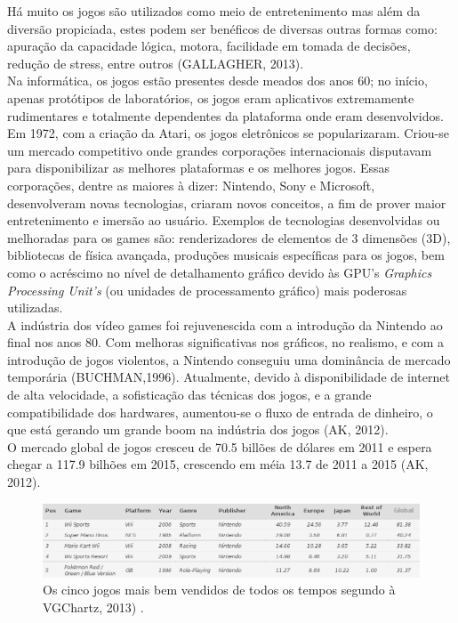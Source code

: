 \documentclass{article}
\begin{document}
Há muito os jogos são utilizados como meio de entretenimento mas além da diversão propiciada, estes podem ser benéficos de diversas outras formas como: apuração da capacidade lógica, motora, facilidade em tomada de decisões, redução de stress, entre outros (GALLAGHER, 2013).
\\
	Na informática, os jogos estão presentes desde meados dos anos 60; no início, apenas protótipos de laboratórios, os jogos eram aplicativos extremamente rudimentares e totalmente dependentes da plataforma onde eram desenvolvidos.
\\
Em 1972, com a criação da Atari, os jogos eletrônicos se popularizaram. Criou-se um mercado competitivo onde grandes corporações internacionais disputavam para disponibilizar as melhores plataformas e os melhores jogos.  Essas corporações, dentre as maiores à dizer: Nintendo, Sony e Microsoft, desenvolveram novas tecnologias, criaram novos conceitos, a fim de prover maior entretenimento e imersão ao usuário. Exemplos de tecnologias desenvolvidas ou melhoradas para os games são: renderizadores de elementos de 3 dimensões (3D), bibliotecas de física avançada, produções musicais específicas para os jogos, bem como o acréscimo no nível de detalhamento gráfico devido às GPU's \textit{Graphics Processing Unit's} (ou unidades de processamento gráfico) mais poderosas utilizadas.
\\
A indústria dos vídeo games foi rejuvenescida com a introdução da Nintendo ao final nos anos 80. Com melhoras significativas  nos gráficos, no realismo, e com a introdução de jogos violentos, a Nintendo conseguiu uma dominância de mercado temporária (BUCHMAN,1996).
	Atualmente, devido à disponibilidade de internet de alta velocidade, a sofisticação das técnicas dos jogos, e a grande compatibilidade dos hardwares, aumentou-se o fluxo de entrada de dinheiro, o que está gerando um grande boom na indústria dos jogos (AK, 2012).
\\
	O mercado global de jogos cresceu de 70.5 billões de dólares em 2011 e espera chegar a 117.9 bilhões em 2015, crescendo em méia 13.7 de 2011 a 2015 (AK, 2012).


\begin{figure}[!htbp]
    \begin{center}
        \includegraphics[width=\textwidth]{asset/img/bestSelledGames.jpg}
               \caption{Os cinco jogos mais bem vendidos de todos os tempos segundo à VGChartz, 2013) . \label{fig:Jogos mais bem vendidos}}
    \end{center}
\end{figure}
\end{document}
